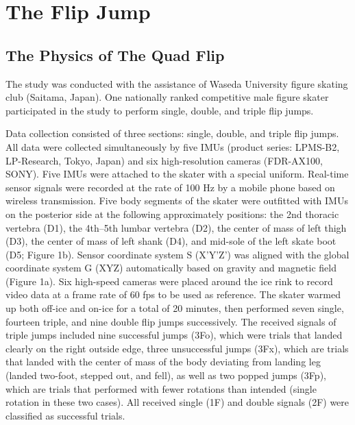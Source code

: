 \documentclass[12pt,journal,compsoc]{IEEEtran}
\begin{document}

\section{The Flip Jump}

\subsection{The Physics of The Quad Flip}
The study was conducted with the assistance of Waseda University figure skating club
(Saitama, Japan). One nationally ranked competitive male figure skater participated in the study to
perform single, double, and triple flip jumps. 

Data collection consisted of three sections: single, double, and triple flip jumps. All data were
collected simultaneously by five IMUs (product series: LPMS-B2, LP-Research, Tokyo, Japan) and six
high-resolution cameras (FDR-AX100, SONY). Five IMUs were attached to the skater with a special
uniform. Real-time sensor signals were recorded at the rate of 100 Hz by a mobile phone based on
wireless transmission. Five body segments of the skater were outfitted with IMUs on the posterior side
at the following approximately positions: the 2nd thoracic vertebra (D1), the 4th–5th lumbar vertebra
(D2), the center of mass of left thigh (D3), the center of mass of left shank (D4), and mid-sole of the left
skate boot (D5; Figure 1b). Sensor coordinate system S (X’Y’Z’) was aligned with the global coordinate
system G (XYZ) automatically based on gravity and magnetic field (Figure 1a). Six high-speed cameras
were placed around the ice rink to record video data at a frame rate of 60 fps to be used as reference.
The skater warmed up both off-ice and on-ice for a total of 20 minutes, then performed seven
single, fourteen triple, and nine double flip jumps successively. The received signals of triple jumps
included nine successful jumps (3Fo), which were trials that landed clearly on the right outside edge,
three unsuccessful jumps (3Fx), which are trials that landed with the center of mass of the body
deviating from landing leg (landed two-foot, stepped out, and fell), as well as two popped jumps
(3Fp), which are trials that performed with fewer rotations than intended (single rotation in these two
cases). All received single (1F) and double signals (2F) were classified as successful trials. 
\end{document}
